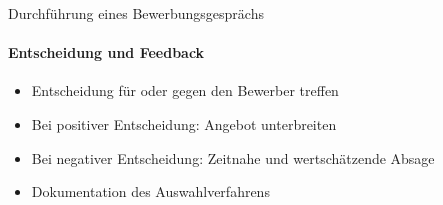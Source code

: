 \begin{KR}{Durchführung eines Bewerbungsgesprächs}
\paragraph{Entscheidung und Feedback}
\begin{itemize}
    \item Entscheidung für oder gegen den Bewerber treffen
    \item Bei positiver Entscheidung: Angebot unterbreiten
    \item Bei negativer Entscheidung: Zeitnahe und wertschätzende Absage
    \item Dokumentation des Auswahlverfahrens
\end{itemize}
\end{KR}